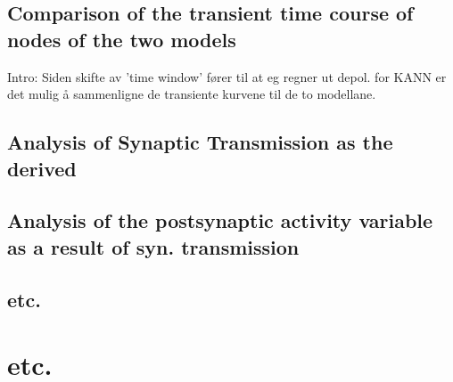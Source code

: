 	\subsection{Comparison of the transient time course of nodes of the two models}
		Intro: Siden skifte av 'time window' fører til at eg regner ut depol. for KANN er det mulig å sammenligne de transiente kurvene til de to modellane.
	\subsection{Analysis of Synaptic Transmission as the derived}
	\subsection{Analysis of the postsynaptic activity variable as a result of syn. transmission} %
	\subsection{etc.}
\section{etc.}

